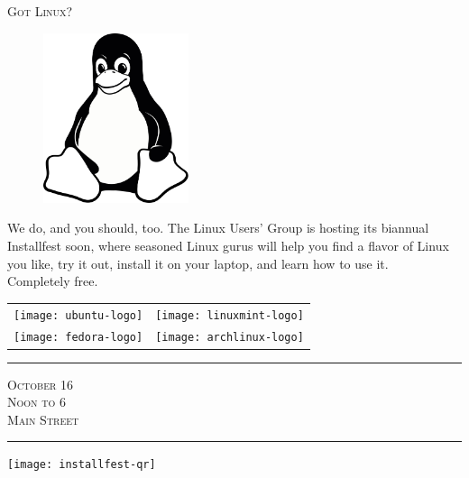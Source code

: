 \documentclass[12pt]{article}
\begin{document}
\pagestyle{empty}

\begin{center} \LARGE \scshape
    Got Linux?
\end{center}

\begin{figure}
    \vspace{-2em} %
    \begin{center}
        \includegraphics[width=0.38\textwidth]{tux-bw}
    \end{center}
    \vspace{-2em} %
\end{figure}

{\small%

    We do, and you should, too. The Linux Users' Group is hosting its biannual
    Installfest soon, where seasoned Linux gurus will help you find a flavor of
    Linux you like, try it out, install it on your laptop, and learn how to use
    it.\\
    Completely free.

}

\begin{center}
\begin{tabular}{SS}
    \texttt{[image: ubuntu-logo]} &
    \texttt{[image: linuxmint-logo]} \\
    \texttt{[image: fedora-logo]} &
    \texttt{[image: archlinux-logo]} \\
\end{tabular}

\begin{minipage}[bt]{0.58\textwidth}
    \begin{center}
        \hrule{}
        \vspace{1em}
        {\large \scshape%
            October 16 \\[0em]
            Noon to 6 \\[0em]
            Main Street \\[0em]
        }
        \vspace{1em}
        \hrule{}
    \end{center}
\end{minipage}
\begin{minipage}[bt]{0.38\textwidth}
    \begin{center}
        \texttt{[image: installfest-qr]}
    \end{center}
\end{minipage}
\end{center}
\end{document}
